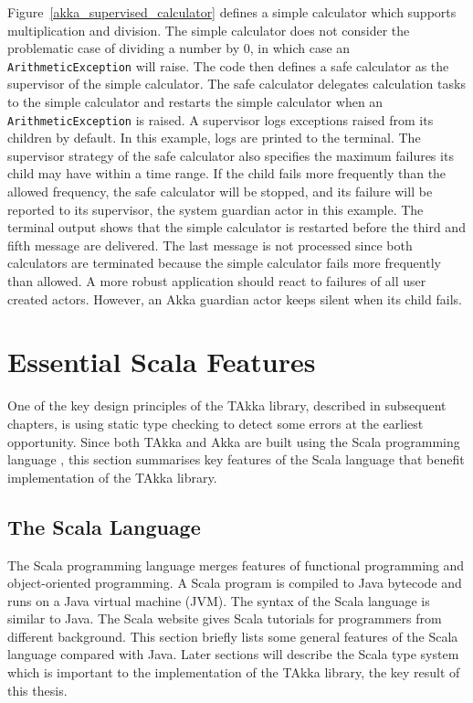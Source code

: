 Figure~\ref{akka_supervised_calculator} defines a simple calculator which 
supports multiplication and division. The simple calculator does not consider 
the problematic case of dividing a number by 0, in which case an 
{\tt ArithmeticException} will raise. The code then defines a safe calculator 
as the supervisor of the simple calculator. The safe calculator delegates
calculation tasks to the simple calculator and restarts the simple calculator 
when an {\tt ArithmeticException} is raised.  A supervisor logs exceptions 
raised from its children by default.  In this example, logs are printed to the 
terminal.  The supervisor strategy of the 
safe calculator also specifies the maximum failures its child may have
within a time range. If the child fails more frequently than the allowed 
frequency, the safe calculator will be stopped, and its failure will be 
reported to its supervisor, the system guardian actor in this example.
The terminal output shows that the simple calculator is restarted before the 
third and fifth message are delivered. The last message is not processed since
both calculators are terminated because the simple calculator fails more 
frequently than allowed.  A more robust application should react to failures
of all user created actors.  However, an Akka guardian actor keeps silent
when its child fails.



\section{Essential Scala Features}
\label{scala_essence}

One of the key design principles of the TAkka library, described in 
subsequent chapters, is using static type checking to detect some errors at the 
earliest opportunity.  Since both TAkka and Akka are built using the Scala 
programming language \citep{scala_lan, scala_specification}, this section 
summarises key features of the Scala language that benefit implementation 
of the TAkka library.  

\subsection{The Scala Language}
The Scala programming language merges features of functional programming
and object-oriented programming.  A Scala program is compiled to Java bytecode
and runs on a Java virtual machine (JVM).  The syntax of the Scala language is
similar to Java.  The Scala website \citep{scala_web_doc} gives Scala tutorials for 
programmers from different background.  This section briefly lists some general
features of the Scala language compared with Java.  Later sections will describe
the Scala type system which is important to the implementation of the TAkka library,
the key result of this thesis.

